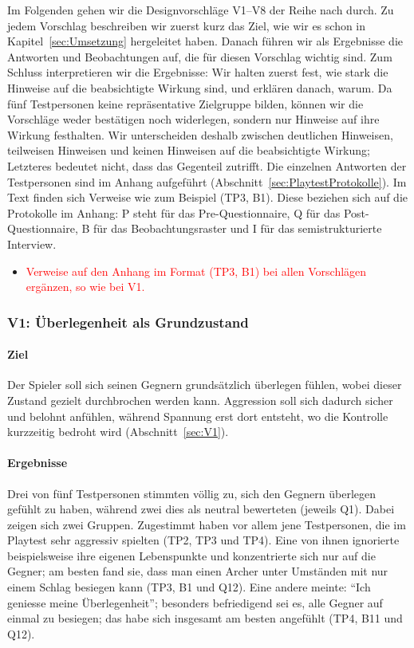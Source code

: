 \documentclass[../Main.tex]{subfiles}
\begin{document}
Im Folgenden gehen wir die Designvorschläge V1--V8 der Reihe nach durch. Zu jedem Vorschlag beschreiben wir zuerst kurz das Ziel, wie wir es schon in Kapitel~\ref{sec:Umsetzung} hergeleitet haben. Danach führen wir als Ergebnisse die Antworten und Beobachtungen auf, die für diesen Vorschlag wichtig sind. Zum Schluss interpretieren wir die Ergebnisse: Wir halten zuerst fest, wie stark die Hinweise auf die beabsichtigte Wirkung sind, und erklären danach, warum. Da fünf Testpersonen keine repräsentative Zielgruppe bilden, können wir die Vorschläge weder bestätigen noch widerlegen, sondern nur Hinweise auf ihre Wirkung festhalten. Wir unterscheiden deshalb zwischen deutlichen Hinweisen, teilweisen Hinweisen und keinen Hinweisen auf die beabsichtigte Wirkung; Letzteres bedeutet nicht, dass das Gegenteil zutrifft. Die einzelnen Antworten der Testpersonen sind im Anhang aufgeführt (Abschnitt~\ref{sec:PlaytestProtokolle}). Im Text finden sich Verweise wie zum Beispiel (TP3, B1). Diese beziehen sich auf die Protokolle im Anhang: P steht für das Pre-Questionnaire, Q für das Post-Questionnaire, B für das Beobachtungsraster und I für das semistrukturierte Interview.

\begin{itemize}[leftmargin=1.5cm]
    \item \textcolor{red}{Verweise auf den Anhang im Format (TP3, B1) bei allen Vorschlägen ergänzen, so wie bei V1.}
\end{itemize}

\subsubsection{V1: Überlegenheit als Grundzustand}

\paragraph{Ziel}
Der Spieler soll sich seinen Gegnern grundsätzlich überlegen fühlen, wobei dieser Zustand gezielt durchbrochen werden kann. Aggression soll sich dadurch sicher und belohnt anfühlen, während Spannung erst dort entsteht, wo die Kontrolle kurzzeitig bedroht wird (Abschnitt~\ref{sec:V1}).

\paragraph{Ergebnisse}
Drei von fünf Testpersonen stimmten völlig zu, sich den Gegnern überlegen gefühlt zu haben, während zwei dies als neutral bewerteten (jeweils Q1). Dabei zeigen sich zwei Gruppen. Zugestimmt haben vor allem jene Testpersonen, die im Playtest sehr aggressiv spielten (TP2, TP3 und TP4). Eine von ihnen ignorierte beispielsweise ihre eigenen Lebenspunkte und konzentrierte sich nur auf die Gegner; am besten fand sie, dass man einen Archer unter Umständen mit nur einem Schlag besiegen kann (TP3, B1 und Q12). Eine andere meinte: \enquote{Ich geniesse meine Überlegenheit}; besonders befriedigend sei es, alle Gegner auf einmal zu besiegen; das habe sich insgesamt am besten angefühlt (TP4, B11 und Q12).
\end{document}
